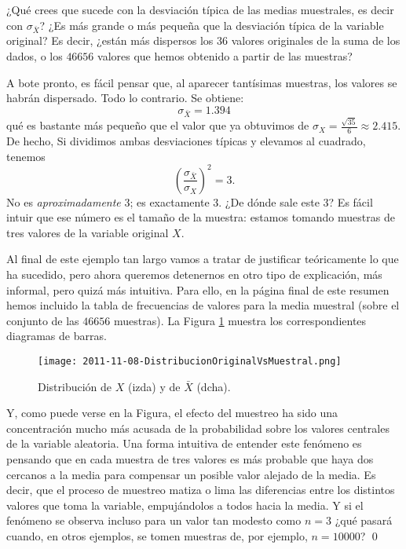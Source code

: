 \begin{itemize}
\begin{ejemplo}
        ¿Qué crees que sucede con la desviación típica de las medias muestrales, es decir con $\sigma_{\bar X}$?  ¿Es más grande o más pequeña que la desviación típica de la variable original? Es decir, ¿están más dispersos los 36 valores originales de la suma de los dados, o los $46656$ valores que hemos obtenido a partir de las muestras?

        A bote pronto, es fácil pensar que, al aparecer tantísimas muestras, los valores se habrán dispersado. Todo lo contrario. Se obtiene:
        \[\sigma_{\bar X}=1.394\]
        qué es bastante más pequeño que el valor que ya obtuvimos de $\sigma_X=\frac{\sqrt{35}}{6}\approx 2.415$. De hecho, Si dividimos ambas desviaciones típicas y elevamos al cuadrado, tenemos
        \[\left(\dfrac{\sigma_{\bar X}}{\sigma_X}\right)^2=3.\]
        No es {\em aproximadamente} 3; es {\sf exactamente} $3$. ¿De dónde sale este $3$? Es fácil intuir que ese número es el tamaño de la muestra: estamos tomando muestras de tres valores de la variable original $X$.

        Al final de este ejemplo tan largo vamos a tratar de justificar teóricamente lo que ha sucedido, pero ahora queremos detenernos en otro tipo de explicación, más informal, pero quizá más intuitiva. Para ello, en la página final de este resumen hemos incluido la tabla de frecuencias de valores para la media muestral (sobre el conjunto de las $46656$ muestras). La Figura \ref{fig:distribucionXvsMediasMuestrales} muestra los correspondientes diagramas de barras.
        \begin{figure}[h]
        \begin{center}
        \caption{Distribución de $X$ (izda) y de $\bar X$ (dcha).\label{fig:distribucionXvsMediasMuestrales}}
        \texttt{[image: 2011-11-08-DistribucionOriginalVsMuestral.png]}
        \end{center}
        \end{figure}

       Y, como puede verse en la Figura, el efecto del muestreo ha sido una concentración mucho más acusada de la probabilidad sobre los valores centrales de la variable aleatoria. Una forma intuitiva de entender este fenómeno es pensando que en cada muestra de tres valores es más probable que haya dos cercanos a la media para compensar un posible valor alejado de la media. Es decir, que el proceso de muestreo matiza o lima las diferencias entre los distintos valores que toma la variable, empujándolos a todos hacia la media. Y si el fenómeno se observa incluso para un valor tan modesto como $n=3$ ¿qué pasará cuando, en otros ejemplos, se tomen muestras de, por ejemplo, $n=10000$? \qed


\end{ejemplo}
\end{itemize}
